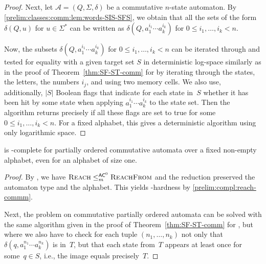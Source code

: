\begin{proof}
	Next, let $\mathcal A = (Q, \Sigma, \delta)$ be a commutative $n$-state automaton.
	By \cref{prelim:classes:comm:lem:words-SIS-SFS},
	we obtain that all the sets of the form $\delta(Q, u)$ for $u \in \Sigma^*$
	can be written as $\delta(Q, a_1^{i_1} \cdots a_k^{i_k})$
	for $0 \le i_1, \ldots, i_k < n$.	
	
	Now, the subsets $\delta(Q, a_1^{i_1} \cdots a_k^{i_k})$
	for $0 \le i_1, \ldots, i_k < n$	
	can be iterated through and tested for equality
	with a given target set $S$ in deterministic log-space
	similarly as in the proof of Theorem~\ref{thm:SF-ST-comm} for \ST 
	by iterating through the states, the letters, the numbers $i_j$, 
	and using two memory cells. We also use, additionally, $|S|$ Boolean flags
	that indicate for each state in~$S$ whether it has
	been hit by some state when applying $a_1^{i_1} \cdots a_k^{i_k}$
	to the state set. Then the algorithm
	returns \rYES precisely if all these flags are set to true
	for some $0 \le i_1, \ldots, i_k < n$.
	For a fixed alphabet, 
	this gives a deterministic algorithm using only logarithmic space.
\end{proof}

\begin{theorem}  \label{prelim:compl:reachf-commm}
	\REACHF is \LOGSPACE-complete for  partially ordered commutative automata
	over a fixed non-empty alphabet, even for an alphabet of size one.
\end{theorem}
\begin{proof}
	By ,
	we have $\text{\sc Reach} \le_m^{\textup{\textsf{AC}}^0} \text{\sc ReachFrom}$ and the reduction
	preserved the automaton type and the alphabet.
	This yields \LOGSPACE-hardness by \cref{prelim:compl:reach-commm}.
	
	Next, the problem on commutative partially ordered automata can be solved 
	with the same algorithm given in the proof
	of Theorem~\ref{thm:SF-ST-comm} for \ST, but where we also have
	to check for each tuple $(n_1, \ldots, n_k)$
	not only that $\delta(q, a_1^{n_1}\cdots a_k^{n_k})$
	is in~$T$, but that each state from~$T$
	appears at least once for some~$q \in S$, i.e., the image equals precisely~$T$.
\end{proof}


